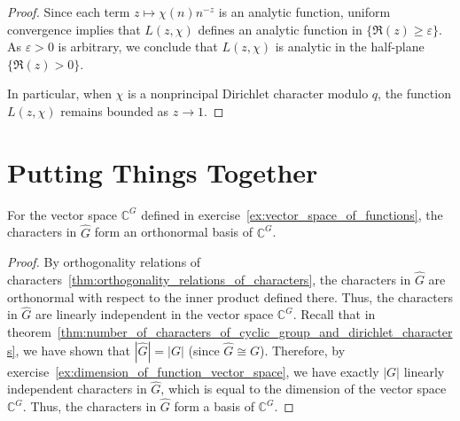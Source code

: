 \documentclass{elegantbook}
\begin{document}
\begin{proof}
  Since each term \(z\mapsto \chi(n)n^{-z}\) is an analytic function, uniform convergence implies that \(L(z,\chi)\) defines an analytic function in \(\{\Re(z)\ge \varepsilon\}\). As \(\varepsilon>0\) is arbitrary, we conclude that \(L(z,\chi)\) is analytic in the half-plane \(\{\Re(z)>0\}\).

  In particular, when \(\chi\) is a nonprincipal Dirichlet character modulo \(q\), the function \(L(z,\chi)\) remains bounded as \(z\to 1\).
\end{proof}


\section{Putting Things Together}

\begin{theorem} \label{thm:characters_form_orthonormal_basis}
  For the vector space $\mathbb{C}^{G}$ defined in exercise~\ref{ex:vector_space_of_functions}, the characters in $\widehat{G}$ form an orthonormal basis of $\mathbb{C}^{G}$.
\end{theorem}

\begin{proof}
  By orthogonality relations of characters~\ref{thm:orthogonality_relations_of_characters}, the characters in $\widehat{G}$ are orthonormal with respect to the inner product defined there. Thus, the characters in $\widehat{G}$ are linearly independent in the vector space $\mathbb{C}^{G}$. 
  Recall that in theorem~\ref{thm:number_of_characters_of_cyclic_group_and_dirichlet_characters}, we have shown that $|\widehat{G}| = |G|$ (since $\widehat{G} \cong G$). Therefore, by exercise~\ref{ex:dimension_of_function_vector_space}, we have exactly $|G|$ linearly independent characters in $\widehat{G}$, which is equal to the dimension of the vector space $\mathbb{C}^{G}$. Thus, the characters in $\widehat{G}$ form a basis of $\mathbb{C}^{G}$.
\end{proof}
\end{document}
